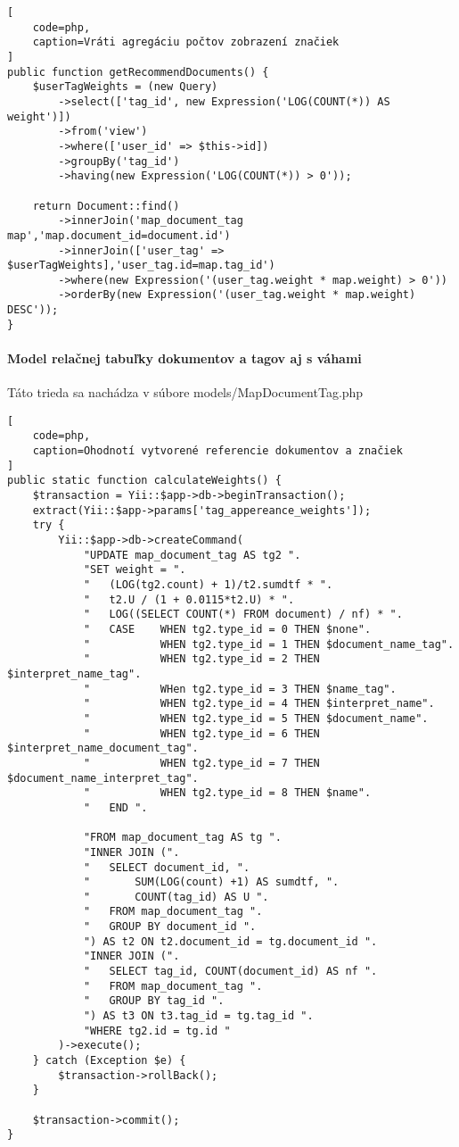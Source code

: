 \begin{lstlisting}[
    code=php,
    caption=Vráti agregáciu počtov zobrazení značiek
]
public function getRecommendDocuments() {
    $userTagWeights = (new Query)
        ->select(['tag_id', new Expression('LOG(COUNT(*)) AS weight')])
        ->from('view')
        ->where(['user_id' => $this->id])
        ->groupBy('tag_id')
        ->having(new Expression('LOG(COUNT(*)) > 0'));

    return Document::find()
        ->innerJoin('map_document_tag map','map.document_id=document.id')
        ->innerJoin(['user_tag' => $userTagWeights],'user_tag.id=map.tag_id')
        ->where(new Expression('(user_tag.weight * map.weight) > 0'))
        ->orderBy(new Expression('(user_tag.weight * map.weight) DESC'));
}
\end{lstlisting}

\paragraph{Model relačnej tabuľky dokumentov a tagov aj s váhami}

Táto trieda sa nachádza v súbore models/MapDocumentTag.php

\begin{lstlisting}[
    code=php,
    caption=Ohodnotí vytvorené referencie dokumentov a značiek
]
public static function calculateWeights() {
    $transaction = Yii::$app->db->beginTransaction();
    extract(Yii::$app->params['tag_appereance_weights']);
    try {
        Yii::$app->db->createCommand(
            "UPDATE map_document_tag AS tg2 ".
            "SET weight = ".
            "   (LOG(tg2.count) + 1)/t2.sumdtf * ".
            "   t2.U / (1 + 0.0115*t2.U) * ".
            "   LOG((SELECT COUNT(*) FROM document) / nf) * ".
            "   CASE    WHEN tg2.type_id = 0 THEN $none".
            "           WHEN tg2.type_id = 1 THEN $document_name_tag".
            "           WHEN tg2.type_id = 2 THEN $interpret_name_tag".
            "           WHen tg2.type_id = 3 THEN $name_tag".
            "           WHEN tg2.type_id = 4 THEN $interpret_name".
            "           WHEN tg2.type_id = 5 THEN $document_name".
            "           WHEN tg2.type_id = 6 THEN $interpret_name_document_tag".
            "           WHEN tg2.type_id = 7 THEN $document_name_interpret_tag".
            "           WHEN tg2.type_id = 8 THEN $name".
            "   END ".

            "FROM map_document_tag AS tg ".
            "INNER JOIN (".
            "   SELECT document_id, ".
            "       SUM(LOG(count) +1) AS sumdtf, ".
            "       COUNT(tag_id) AS U ".
            "   FROM map_document_tag ".
            "   GROUP BY document_id ".
            ") AS t2 ON t2.document_id = tg.document_id ".
            "INNER JOIN (".
            "   SELECT tag_id, COUNT(document_id) AS nf ".
            "   FROM map_document_tag ".
            "   GROUP BY tag_id ".
            ") AS t3 ON t3.tag_id = tg.tag_id ".
            "WHERE tg2.id = tg.id "
        )->execute();
    } catch (Exception $e) {
        $transaction->rollBack();
    }

    $transaction->commit();
}
\end{lstlisting}


